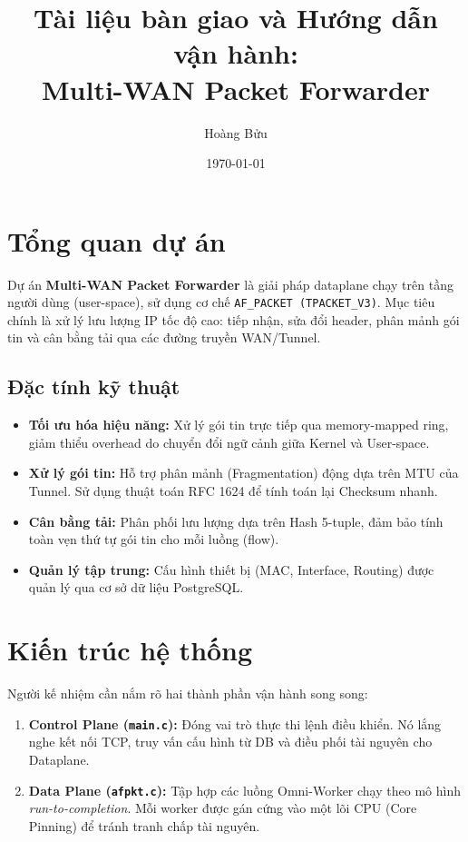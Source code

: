 \documentclass[12pt,a4paper]{article}
\title{\textbf{Tài liệu bàn giao và Hướng dẫn vận hành:\\ Multi-WAN Packet Forwarder}}
\author{Hoàng Bửu}
\date{\today}
\begin{document}
\maketitle

\section{Tổng quan dự án}
Dự án \textbf{Multi-WAN Packet Forwarder} là giải pháp dataplane chạy trên tầng người dùng (user-space), sử dụng cơ chế \texttt{AF\_PACKET (TPACKET\_V3)}. Mục tiêu chính là xử lý lưu lượng IP tốc độ cao: tiếp nhận, sửa đổi header, phân mảnh gói tin và cân bằng tải qua các đường truyền WAN/Tunnel.

\subsection{Đặc tính kỹ thuật}
\begin{itemize}
    \item \textbf{Tối ưu hóa hiệu năng:} Xử lý gói tin trực tiếp qua memory-mapped ring, giảm thiểu overhead do chuyển đổi ngữ cảnh giữa Kernel và User-space.
    \item \textbf{Xử lý gói tin:} Hỗ trợ phân mảnh (Fragmentation) động dựa trên MTU của Tunnel. Sử dụng thuật toán RFC 1624 để tính toán lại Checksum nhanh.
    \item \textbf{Cân bằng tải:} Phân phối lưu lượng dựa trên Hash 5-tuple, đảm bảo tính toàn vẹn thứ tự gói tin cho mỗi luồng (flow).
    \item \textbf{Quản lý tập trung:} Cấu hình thiết bị (MAC, Interface, Routing) được quản lý qua cơ sở dữ liệu PostgreSQL.
\end{itemize}

\section{Kiến trúc hệ thống}
Người kế nhiệm cần nắm rõ hai thành phần vận hành song song:
\begin{enumerate}
    \item \textbf{Control Plane (\texttt{main.c}):} Đóng vai trò thực thi lệnh điều khiển. Nó lắng nghe kết nối TCP, truy vấn cấu hình từ DB và điều phối tài nguyên cho Dataplane.
    \item \textbf{Data Plane (\texttt{afpkt.c}):} Tập hợp các luồng Omni-Worker chạy theo mô hình \textit{run-to-completion}. Mỗi worker được gán cứng vào một lõi CPU (Core Pinning) để tránh tranh chấp tài nguyên.
\end{enumerate}
\end{document}

